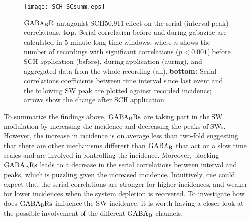     \begin{figure}
      \texttt{[image: SCH\_SCsumm.eps]}
      \caption{
        $\rm GABA_BR$ antagonist SCH50,911 effect on the serial (interval-peak)
        correlations. \textbf{top:} Serial correlation before and during
        gabazine are calculated in 5-minute long time windows, where $n$ shows
        the number of recordings with significant correlations ($p<0.001$)
        before SCH application (before), during application (during), and
        aggregated data from the whole recording (all). \textbf{bottom:} Serial
        correlations coefficients between time interval since last event and
        the following SW peak are plotted against recorded incidence; arrows
        show the change after SCH application.
            }
    \label{gB_SCsumm}
    \end{figure}

    To summarize the findings above, $\rm GABA_B Rs$ are taking part in the SW
    modulation by increasing the incidence and decreasing the peaks of SWs.
    However, the increase in incidence is on average less than two-fold
    suggesting that there are other mechanisms different than $\rm GABA_B$ that
    act on a slow time scales and are involved in controlling the incidence.
    Moreover, blocking $\rm GABA_B Rs$ leads to a decrease in the serial
    correlations between interval and peaks, which is puzzling given the
    increased incidence. Intuitively, one could expect that the serial
    correlations are stronger for higher incidences, and weaker for lower
    incidences when the system depletion is recovered. To investigate how does
    $\rm GABA_B Rs$ influence the SW incidence, it is worth having a closer
    look at the possible involvement of the different $\rm GABA_B$ channels.

